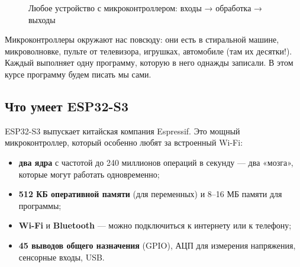\begin{figure}[H]
\centering
{}
\caption{Любое устройство с микроконтроллером: входы → обработка → выходы}
\end{figure}

Микроконтроллеры окружают нас повсюду: они есть в стиральной машине, микроволновке, пульте от
телевизора, игрушках, автомобиле (там их десятки!). Каждый выполняет одну программу, которую в него
однажды записали. В этом курсе программу будем писать мы сами.

\subsection{Что умеет ESP32-S3}

ESP32-S3 выпускает китайская компания Espressif. Это мощный микроконтроллер, который
особенно любят за встроенный Wi-Fi:

\begin{itemize}
  \item \textbf{два ядра} с частотой до 240 миллионов операций в секунду --- два «мозга», которые
        могут работать одновременно;
  \item \textbf{512 КБ оперативной памяти} (для переменных) и 8--16 МБ памяти для программы;
  \item \textbf{Wi-Fi} и \textbf{Bluetooth} --- можно подключиться к интернету или к телефону;
  \item \textbf{45 выводов общего назначения} (GPIO), АЦП для измерения напряжения, сенсорные входы, USB.
\end{itemize}

